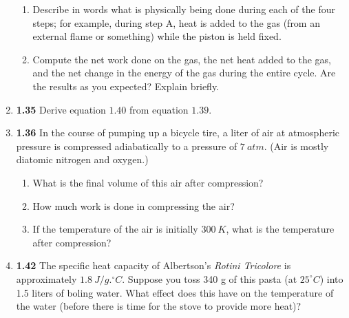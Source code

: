 \documentclass[fleqn]{article}
\begin{document}
\begin{enumerate}
\begin{enumerate}

      \item Describe in words what is physically being done during each of the four steps; for example, during step A, heat is added to the 
      gas (from an external flame or something) while the piston is held fixed.
    

      \item Compute the net work done on the gas, the net heat added to the gas, and the net change in the energy of the gas during the entire
      cycle. Are the results as you expected? Explain briefly.


    \end{enumerate}


    \item \textbf{1.35} Derive equation $1.40$ from equation $1.39$.
  

    \item \textbf{1.36} In the course of pumping up a bicycle tire, a liter of air at atmospheric pressure is compressed adiabatically 
    to a pressure of $7 ~ atm$. (Air is mostly diatomic nitrogen and oxygen.)
    \begin{enumerate}
      \item What is the final volume of this air after compression?


      \item How much work is done in compressing the air?

      
      \item If the temperature of the air is initially $300 ~ K$, what is the temperature after compression?


    \end{enumerate}


    \item \textbf{1.42} The specific heat capacity of Albertson's \emph{Rotini Tricolore} is approximately $1.8 ~ J/g.^{\circ}C$. Suppose 
    you toss 340 g of this pasta (at $25^{\circ}C$) into 1.5 liters of boling water. What effect does this have on the temperature of the
    water (before there is time for the stove to provide more heat)?


  \end{enumerate}
\end{document}
